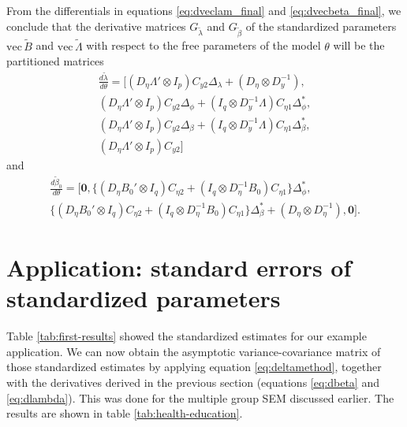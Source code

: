\documentclass[a4paper, 11pt]{article}
\newcommand{\n}{\eta}
\renewcommand{\l}{\lambda}
\renewcommand{\b}{\beta}
\newcommand{\p}{\phi}
\newcommand{\kronprod}{\otimes}
\renewcommand{\vec}{\mathrm{vec}\,}
\newcommand{\Lambdastan}{\tilde{\Lambda}}
\newcommand{\Bstan}{\tilde{B}}
\newcommand{\0}{\boldsymbol{0}}
\begin{document}
From the differentials in equations \ref{eq:dveclam_final} and
\ref{eq:dvecbeta_final},
we conclude that the derivative matrices  $G_{\tilde{\l}}$ and 
$G_{\tilde{\b}}$ of the standardized parameters $\vec \Bstan$ and 
$\vec \Lambdastan$ with respect to the free parameters of the model 
$\theta$ will be the partitioned matrices
\begin{multline}\label{eq:dlambda}
\frac{d \tilde\l}{d \theta} = [
        (D_\n \Lambda' \kronprod I_p) C_{y2} \Delta_\l + 
            (D_\n \kronprod D_y^{-1}), \\
        (D_\n \Lambda' \kronprod I_p) C_{y2} \Delta_\p +
         (I_q \kronprod D_y^{-1}\Lambda) C_{\n1} \Delta^*_\p, \\
        (D_\n \Lambda' \kronprod I_p) C_{y2} \Delta_\b + 
            (I_q \kronprod D_y^{-1}\Lambda) C_{\n1} \Delta^*_\b,\\
        (D_\n \Lambda' \kronprod I_p) C_{y2}  
 ] 
\end{multline}
and
\begin{multline}\label{eq:dbeta}
\frac{d \tilde\b_0}{d \theta} = [
        \0,
        \{(D_\n B_0' \kronprod I_q) C_{\n2}  + 
            (I_q \kronprod D_\n^{-1}B_0) C_{\n1} \} \Delta^*_\p
            ,\\
        \{(D_\n B_0' \kronprod I_q) C_{\n2}  + 
            (I_q \kronprod D_\n^{-1}B_0) C_{\n1} \} \Delta^*_\b +
            (D_\n \kronprod D_\n^{-1})
            ,
        \0
 ] .
\end{multline}


\section{Application: standard errors of standardized parameters}

Table  \ref{tab:first-results} showed the standardized estimates for our example application. We can now obtain the 
 asymptotic variance-covariance matrix of those standardized estimates 
by applying equation \ref{eq:deltamethod}, together with the derivatives derived in the previous section (equations \ref{eq:dbeta} and \ref{eq:dlambda}). This was done for the multiple group SEM discussed earlier. The results are shown in table \ref{tab:health-education}.
\end{document}
